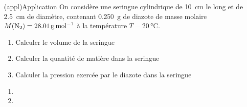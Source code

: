 \documentclass[../../main/main.tex]{subfiles}
\begin{document}
\begin{tcb}[label=appl:gp, sidebyside](appl){Application}
	On considère une seringue cylindrique de \SI{10}{cm} le long et de
	\SI{2.5}{cm} de diamètre, contenant \SI{0.250}{g} de diazote de masse
	molaire $M({\rm N}_2) = \SI{28.01}{g.mol^{-1}}$ à la
	température $T = \SI{20}{\degreeCelsius}$.
	\begin{enumerate}
		\item Calculer le volume de la seringue
		\item Calculer la quantité de matière dans la seringue
		\item Calculer la pression exercée par le diazote dans la seringue
	\end{enumerate}
	\tcblower
	\begin{enumerate}
		\item
		\item
		      \mitem
	\end{enumerate}
\end{tcb}
\end{document}
